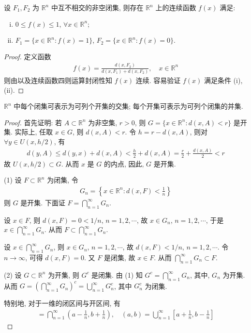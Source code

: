 \documentclass[../../main.tex]{subfiles}
\begin{document}
\begin{proposition}
设 $F_1, F_2$ 为 $\mathbb{R}^n$ 中互不相交的非空闭集, 则存在 $\mathbb{R}^n$ 上的连续函数 $f(x)$ 满足:
\begin{enumerate}[(i)]
\item $0 \leqslant f(x) \leqslant 1$, $\forall x \in \mathbb{R}^n$;
\item $F_1 = \{x \in \mathbb{R}^n : f(x) = 1\}$, $F_2 = \{x \in \mathbb{R}^n : f(x) = 0\}$.
\end{enumerate}
\end{proposition}
\begin{proof}
定义函数
\begin{align*}
f(x) = \frac{d(x, F_2)}{d(x, F_1) + d(x, F_2)}, \quad x \in \mathbb{R}^n
\end{align*}
则由以及连续函数四则运算封闭性知 $f(x)$ 连续. 容易验证 $f(x)$ 满足条件 (i), (ii).
\end{proof}
  
\begin{proposition}
$\mathbb{R}^n$ 中每个闭集可表示为可列个开集的交集; 每个开集可表示为可列个闭集的并集.
\end{proposition}
\begin{proof}
首先证明: 若 $A \subset \mathbb{R}^n$ 为非空集, $r > 0$, 则 $G = \{x \in \mathbb{R}^n : d(x, A) < r\}$ 是开集. 实际上, 任取 $x \in G$, 则 $d(x, A) < r$. 令 $h = r - d(x, A)$, 则对 $\forall y \in U(x, h/2)$, 有
\begin{align*}
d(y, A) \leqslant d(y, x) + d(x, A) < \frac{h}{2} + d(x, A) = \frac{r}{2} + \frac{d(x, A)}{2} < r
\end{align*}
故 $U(x, h/2) \subset G$. 从而 $x$ 是 $G$ 的内点, 因此, $G$ 是开集.

(1) 设 $F \subset \mathbb{R}^n$ 为闭集, 令
\begin{align*}
G_n = \left\{x \in \mathbb{R}^n : d(x, F) < \frac{1}{n}\right\}
\end{align*}
则 $G$ 是开集. 下面证 $F = \bigcap_{n = 1}^{\infty} G_n$.

设 $x \in F$, 则 $d(x, F) = 0 < 1/n$, $n = 1, 2, \cdots$, 故 $x \in G_n$, $n = 1, 2, \cdots$, 于是 $x \in \bigcap_{n = 1}^{\infty} G_n$. 从而 $F \subset \bigcap_{n = 1}^{\infty} G_n$.

设 $x \in \bigcap_{n = 1}^{\infty} G_n$, 则 $x \in G_n$, $n = 1, 2, \cdots$, 故 $d(x, F) < 1/n$, $n = 1, 2, \cdots$. 令 $n \to \infty$, 可得 $d(x, F) = 0$. 又 $F$ 是闭集, 故 $x \in F$. 从而 $\bigcap_{n = 1}^{\infty} G_n \subset F$.

(2) 设 $G \subset \mathbb{R}^n$ 为开集, 则 $G^c$ 是闭集. 由 (1) 知 $G^c = \bigcap_{n = 1}^{\infty} G_n$, 其中, $G_n$ 为开集. 从而 $G = \left(\bigcap_{n = 1}^{\infty} G_n\right)^c = \bigcup_{n = 1}^{\infty} G_n^c$, 其中 $G_n^c$ 为闭集.

特别地, 对于一维的闭区间与开区间, 有
\begin{align*}
[a, b] = \bigcap_{n = 1}^{\infty}\left(a - \frac{1}{n}, b + \frac{1}{n}\right), \quad (a, b) = \bigcup_{n = 1}^{\infty}\left[a + \frac{1}{n}, b - \frac{1}{n}\right]
\end{align*}
\end{proof}
\end{document}
